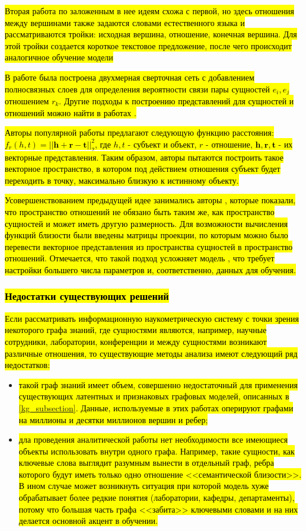 \hl{Вторая работа по заложенным в нее идеям схожа с первой, но здесь отношения между вершинами также задаются словами естественного языка и рассматриваются тройки: исходная вершина, отношение, конечная вершина. Для этой тройки создается короткое текстовое предложение, после чего происходит аналогичное обучение модели }

\hl{В работе \cite{convkg} была построена двухмерная сверточная сеть с добавлением полносвязных слоев для определения вероятности связи пары сущностей $e_i, e_j$ отношением $r_k$. Другие подходы к построению представлений для сущностей и отношений можно найти в работах \cite{NIPS2013_5028, trouillon16}. }

\hl{Авторы популярной работы \cite{transe} предлагают следующую функцию расстояния: $f_r(h, t) = ||\mathbf{h} + \mathbf{r} - \mathbf{t}||_2^2$, где $h,t$ - субъект и объект, $r$ - отношение, $\mathbf{h},\mathbf{r},\mathbf{t}$ - их векторные представления. Таким образом, авторы пытаются построить такое векторное пространство, в котором под действием отношения субъект будет переходить в точку, максимально близкую к истинному объекту. }

\hl{Усовершенствованием предыдущей идее занимались авторы \cite{transr}, которые показали, что пространство отношений не обязано быть таким же, как пространство сущностей и может иметь другую размерность. Для возможности вычисления функций близости были введены матрицы проекции, по которым можно было перевести векторное представления из пространства сущностей в пространство отношений. Отмечается, что такой подход усложняет модель \cite{transe}, что требует настройки большего числа параметров и, соответственно, данных для обучения.}

\subsubsection{\hl{Недостатки существующих решений}}
\hl{Если рассматривать информационную наукометрическую систему с точки зрения некоторого графа знаний, где сущностями являются, например, научные сотрудники, лаборатории, конференции и между сущностями возникают различные отношения, то существующие методы анализа имеют следующий ряд недостатков:}
\begin{itemize}
    \item \hl{такой граф знаний имеет объем, совершенно недостаточный для применения существующих латентных и признаковых графовых моделей, описанных в \ref{kg_subsection}. Данные, используемые в этих работах оперируют графами на миллионы и десятки миллионов вершин и ребер;}
    \item \hl{дла проведения аналитической работы нет необходимости все имеющиеся объекты использовать внутри одного графа. Например, такие сущности, как ключевые слова выглядит разумным вынести в отдельный граф, ребра которого будут иметь только одно отношение <<семантической близости>>. В ином случае может возникнуть ситуация при которой модель хуже обрабатывает более редкие понятия (лаборатории, кафедры, департаменты), потому что большая часть графа <<забита>> ключевыми словами и на них делается основной акцент в обучении.}
\end{itemize}

